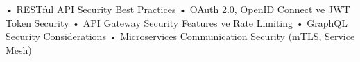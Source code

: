 • RESTful API Security Best Practices
• OAuth 2.0, OpenID Connect ve JWT Token Security
• API Gateway Security Features ve Rate Limiting
• GraphQL Security Considerations
• Microservices Communication Security (mTLS, Service Mesh)